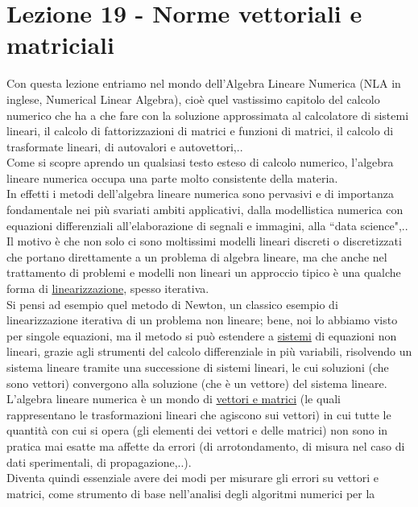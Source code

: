 \section{Lezione 19 - Norme vettoriali e matriciali}
Con questa lezione entriamo nel mondo dell'Algebra Lineare Numerica (NLA in inglese, Numerical Linear Algebra), cioè quel vastissimo capitolo del calcolo numerico che ha a che fare con la soluzione approssimata al calcolatore di sistemi lineari, il calcolo di fattorizzazioni di matrici
e funzioni di matrici, il calcolo di trasformate lineari, di autovalori e autovettori,..\\Come si scopre aprendo un qualsiasi testo esteso di calcolo numerico, l'algebra lineare numerica occupa una parte molto consistente della materia.\\In effetti i metodi dell'algebra lineare numerica sono pervasivi e di importanza fondamentale nei più svariati ambiti applicativi, dalla modellistica numerica con equazioni differenziali all'elaborazione di
segnali e immagini, alla ``data science",..\\Il motivo è che non solo ci sono moltissimi modelli lineari discreti o discretizzati che portano direttamente a un problema di algebra lineare, ma che anche nel trattamento di problemi e modelli non lineari un approccio tipico è una qualche forma di \uline{linearizzazione}, spesso iterativa.\\Si pensi ad esempio quel metodo di Newton, un classico esempio di linearizzazione iterativa di un problema non lineare; bene,
noi lo abbiamo visto per singole equazioni, ma il metodo si può estendere a \uline{sistemi} di equazioni non lineari, grazie agli strumenti del calcolo differenziale in più variabili, risolvendo un sistema lineare tramite una successione di sistemi lineari, le cui soluzioni (che sono vettori) convergono alla soluzione (che è un vettore) del sistema lineare.\\L'algebra lineare numerica è un mondo di \uline{vettori e matrici}
(le quali rappresentano  le trasformazioni lineari che agiscono sui vettori) in cui tutte le quantità con cui si opera (gli elementi dei vettori e delle matrici) non sono in pratica mai esatte ma affette da errori (di arrotondamento, di misura nel caso di dati sperimentali, di propagazione,..).\\Diventa quindi essenziale avere dei modi per misurare gli errori su vettori e matrici, come strumento di base nell'analisi degli algoritmi numerici per la
